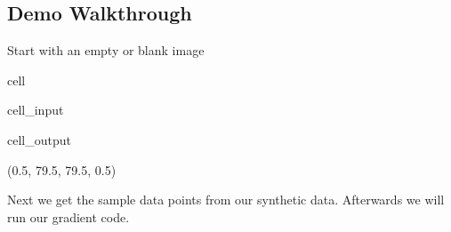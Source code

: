 \documentclass[letterpaper,10pt,english]{jupyterBook}
\begin{document}
\subsection{Demo Walkthrough}
\label{\detokenize{finite_gradient:demo-walkthrough}}
\sphinxAtStartPar
Start with an empty or blank image

\begin{sphinxuseclass}{cell}\begin{sphinxVerbatimInput}

\begin{sphinxuseclass}{cell_input}
\begin{sphinxVerbatim}[commandchars=\\\{\}]
  
\end{sphinxVerbatim}

\end{sphinxuseclass}\end{sphinxVerbatimInput}
\begin{sphinxVerbatimOutput}

\begin{sphinxuseclass}{cell_output}
\begin{sphinxVerbatim}[commandchars=\\\{\}]
(\PYGZhy{}0.5, 79.5, 79.5, \PYGZhy{}0.5)
\end{sphinxVerbatim}

\noindent{}

\end{sphinxuseclass}\end{sphinxVerbatimOutput}

\end{sphinxuseclass}
\sphinxAtStartPar
Next we get the sample data points from our synthetic data. Afterwards we will run our gradient code.
\end{document}
